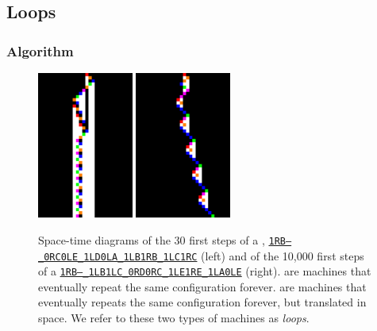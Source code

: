 \newpage
\subsection{Loops}\label{sec:loops}
\subsubsection{Algorithm}\label{sec:loops:algo}

\begin{figure}[h!]
    \centering
    \includegraphics[width=0.28\textwidth]{figures/space-time-diagrams/cycler_279081.pdf}
    \hspace{10ex}
    \includegraphics[width=0.28\textwidth]{figures/space-time-diagrams/tc_1RB---_1LB1LC_0RD0RC_1LE1RE_1LA0LE.pdf}
    \caption{Space-time diagrams of the 30 first steps of a \textit{\cycler}, \href{https://bbchallenge.org/1RB---\_0RC0LE\_1LD0LA\_1LB1RB\_1LC1RC}{\texttt{1RB---\_0RC0LE\_1LD0LA\_1LB1RB\_1LC1RC}} (left) and of the 10,000 first steps of a \textit{\TC} \href{https://bbchallenge.org/1RB---\_1LB1LC\_0RD0RC\_1LE1RE\_1LA0LE}{\texttt{1RB---\_1LB1LC\_0RD0RC\_1LE1RE\_1LA0LE}} (right). \cyclers are machines that eventually repeat the same configuration forever. \TCs are machines that eventually repeats the same configuration forever, but translated in space. We refer to these two types of machines as \textit{loops}.}\label{fig:loops}
\end{figure}

